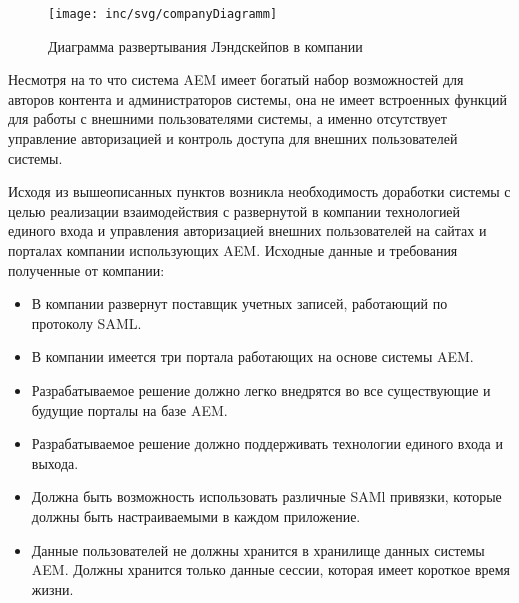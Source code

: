 \begin{figure}[h]
  \centering
  \texttt{[image: inc/svg/companyDiagramm]}
  \caption{Диаграмма развертывания Лэндскейпов в компании}
  \label{fig:companyDiagramm}
\end{figure}

Несмотря на то что система AEM имеет богатый набор возможностей для авторов контента и администраторов системы, она не имеет встроенных функций для работы с внешними пользователями системы, а именно отсутствует управление авторизацией и контроль доступа для внешних пользователей системы.

Исходя из вышеописанных пунктов возникла необходимость доработки системы с целью реализации взаимодействия с развернутой в компании технологией единого входа и управления авторизацией внешних пользователей на сайтах и порталах компании использующих AEM. Исходные данные и требования полученные от компании: 
\begin{itemize} 
\item В компании развернут поставщик учетных записей, работающий по протоколу SAML.
\item В компании имеется три портала работающих на основе системы AEM.
\item Разрабатываемое решение должно легко внедрятся во все существующие и будущие порталы на базе AEM.
\item Разрабатываемое решение должно поддерживать технологии единого входа и  выхода.
\item Должна быть возможность использовать различные SAMl привязки, которые должны быть настраиваемыми в каждом приложение.
\item Данные пользователей не должны хранится в хранилище данных системы AEM. Должны хранится только данные сессии, которая имеет короткое время жизни.
\end{itemize}

%
%

